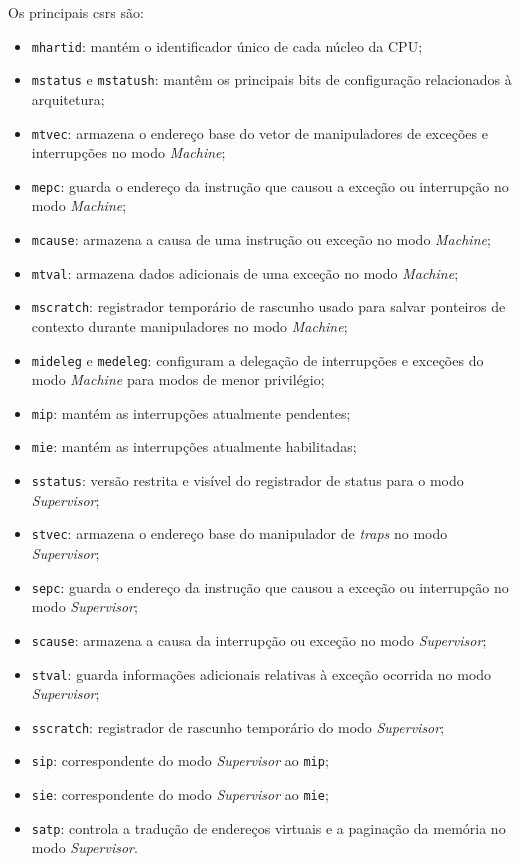 Os principais \glspl{csr} são:

\begin{itemize}
    \item \texttt{mhartid}: mantém o identificador único de cada núcleo da CPU;\@
    \item \texttt{mstatus} e \texttt{mstatush}: mantêm os principais bits de configuração relacionados à arquitetura;
    \item \texttt{mtvec}: armazena o endereço base do vetor de manipuladores de exceções e interrupções no modo \textit{Machine};
    \item \texttt{mepc}: guarda o endereço da instrução que causou a exceção ou interrupção no modo \textit{Machine};
	\item \texttt{mcause}: armazena a causa de uma instrução ou exceção no modo \textit{Machine};
    \item \texttt{mtval}: armazena dados adicionais de uma exceção no modo \textit{Machine};
    \item \texttt{mscratch}: registrador temporário de rascunho usado para salvar ponteiros de contexto durante manipuladores no modo \textit{Machine};
    \item \texttt{mideleg} e \texttt{medeleg}: configuram a delegação de interrupções e exceções do modo \textit{Machine} para modos de menor privilégio;
    \item \texttt{mip}: mantém as interrupções atualmente pendentes;
    \item \texttt{mie}: mantém as interrupções atualmente habilitadas;
    \item \texttt{sstatus}: versão restrita e visível do registrador de status para o modo \textit{Supervisor};
    \item \texttt{stvec}: armazena o endereço base do manipulador de \textit{traps} no modo \textit{Supervisor};
    \item \texttt{sepc}: guarda o endereço da instrução que causou a exceção ou interrupção no modo \textit{Supervisor};
    \item \texttt{scause}: armazena a causa da interrupção ou exceção no modo \textit{Supervisor};
    \item \texttt{stval}: guarda informações adicionais relativas à exceção ocorrida no modo \textit{Supervisor};
    \item \texttt{sscratch}: registrador de rascunho temporário do modo \textit{Supervisor};
    \item \texttt{sip}: correspondente do modo \textit{Supervisor} ao \texttt{mip};
    \item \texttt{sie}: correspondente do modo \textit{Supervisor} ao \texttt{mie};
    \item \texttt{satp}: controla a tradução de endereços virtuais e a paginação da memória no modo \textit{Supervisor}.
\end{itemize}


